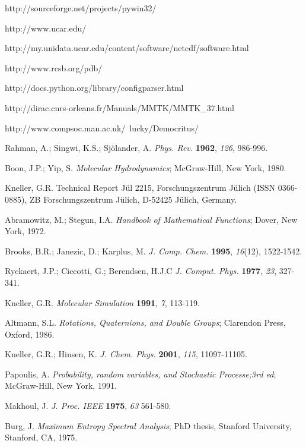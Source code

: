 \documentclass[a4paper,11pt]{report}
\begin{document}
\begin{thebibliography}{99}
 http://sourceforge.net/projects/pywin32/

 http://www.ucar.edu/

 http://my.unidata.ucar.edu/content/software/netcdf/software.html

 http://www.rcsb.org/pdb/

 http://docs.python.org/library/configparser.html

 http://dirac.cnrs-orleans.fr/Manuals/MMTK/MMTK\_37.html

 http://www.compsoc.man.ac.uk/~lucky/Democritus/

 Rahman, A.; Singwi, K.S.; Sj\"olander, A. \textit{Phys. Rev.} \textbf{1962}, \textit{126}, 986-996.

 Boon, J.P.; Yip, S. \textit{Molecular Hydrodynamics}; McGraw-Hill, New York, 1980.

 Kneller, G.R. Technical Report J\"ul 2215, Forschungs\-zen\-trum J\"u\-lich (ISSN 0366-0885), 
ZB Forschungs\-zen\-trum J\"ulich, D-52425 J\"ulich, Germany.

 Abramowitz, M.; Stegun, I.A. \textit{Handbook of Mathematical Functions}; Dover, New York, 1972.

 Brooks, B.R.; Janezic, D.; Karplus, M. \textit{J. Comp. Chem.} \textbf{1995}, \textit{16}(12), 1522-1542.

 Ryckaert, J.P.; Ciccotti, G.; Berendsen, H.J.C \textit{J. Comput. Phys.} \textbf{1977}, \textit{23}, 327-341.

 Kneller, G.R. \textit{Molecular Simulation} \textbf{1991}, \textit{7}, 113-119.

 Altmann, S.L. \textit{Rotations, Quaternions, and Double Groups}; Clarendon Press, Oxford, 1986.

 Kneller, G.R.; Hinsen, K. \textit{J. Chem. Phys.} \textbf{2001}, \textit{115}, 11097-11105.

 Papoulis, A. \textit{Probability, random variables, and Stochastic Processe;3rd ed}; McGraw-Hill, New York, 1991.

 Makhoul, J. \textit{J. Proc. IEEE} \textbf{1975}, \textit{63} 561-580.

 Burg, J. \textit{Maximum Entropy Spectral Analysis}; PhD thesis, Stanford University, Stanford, CA, 1975.


\end{thebibliography}
\end{document}
